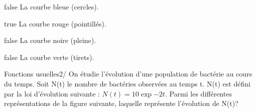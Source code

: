         \begin{reponses}
            \item[false] La courbe bleue (cercles).
		    \item[true] La courbe rouge (pointillés).
		    \item[false] La courbe noire (pleine).
		    \item[false] La courbe verte (tirets).
		    \end{reponses}
            \begin{question}{30}{Fonctions usuelles}{2}{/}
            On étudie l'évolution d'une population de bactérie au cours du temps. Soit N(t) le nombre de bactéries observées au temps t. N(t) est défini par la loi d'évolution suivante : $N(t) = 10\exp{-2t}$. Parmi les différentes représentations de la figure suivante, laquelle représente l'évolution de N(t)?            \begin{figure}
             \end{figure}
        \end{question}

